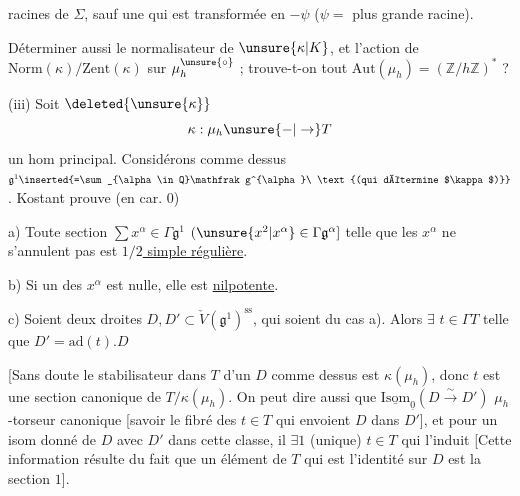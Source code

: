 racines de $\Sigma$, sauf une qui est transformée en $-\psi$ ($\psi=$ plus grande racine).

Déterminer aussi le normalisateur de $\unsure{\kappa|K}$, et l'action de $\mathrm{Norm}(\kappa)/\mathrm{Zent}(\kappa)$ sur $\mu^{\unsure{\circ}}_h$ ; trouve-t-on tout $\mathrm{Aut}(\mu_h)=(\mathbb Z/h\mathbb Z)^{*}$ ?

(iii) Soit $\deleted{\unsure{\kappa}}$
\[
\kappa:\mu_h\unsure{-|\to}T
\]
un hom principal. Considérons comme dessus ${\mathfrak g}^{1}\inserted{=\sum_{\alpha\in Q}\mathfrak g^{\alpha}\ \text{(qui détermine $\kappa$)}}$. Kostant prouve (en car. $0$)

a) Toute section $\sum x^{\alpha}\in\Gamma\mathfrak g^1$ $(\unsure{x^{2}|x^{\alpha}}\in\Gamma\mathfrak g^{\alpha}]$ telle que les $x^{\alpha}$ ne s'annulent pas est \uline{$1/2$ simple régulière}.

b) Si un des $x^{\alpha}$ est nulle, elle est \uline{nilpotente}.

c) Soient deux droites $D,D'\subset\check V(\mathfrak g^{1})^{\mathrm{ss}}$, qui soient du cas a). Alors $\exists$ $t\in\Gamma T$ telle que $D'=\mathrm{ad}(t).D$

[Sans doute le stabilisateur dans $T$ d'un $D$ comme dessus est $\kappa(\mu_h)$, donc $t$ est une section canonique de $T/\kappa(\mu_h)$. On peut dire aussi que  $\underline{\mathrm{Isom}}_{\underline{0}}(D\overset{\sim}{\to}D')$  $\mu_h$-torseur canonique [savoir  le fibré des $t\in T$ qui envoient $D$ dans $D'$], et pour un isom donné de $D$ avec $D'$ dans cette classe, il $\exists 1$ (unique) $t\in T$ qui l'induit [Cette information résulte du fait que un élément de $T$ qui est l'identité sur $D$ est la section $1$].


